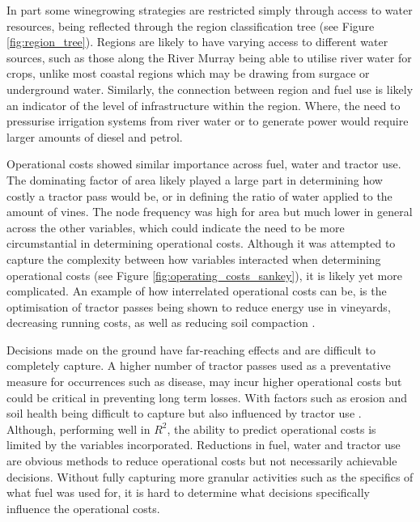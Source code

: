\documentclass[review,12pt,authoryear]{elsarticle}
\begin{document}
\begin{linenumbers}
\par
In part some winegrowing strategies are restricted simply through access to water resources, being reflected through the region classification tree (see Figure \ref{fig:region_tree}). Regions are likely to have varying access to different water sources, such as those along the River Murray being able to utilise river water for crops, unlike most coastal regions which may be drawing from surgace or underground water. Similarly, the connection between region and fuel use is likely an indicator of the level of infrastructure within the region. Where, the need to pressurise irrigation systems from river water or to generate power would require larger amounts of diesel and petrol. %
\par
Operational costs showed similar importance across fuel, water and tractor use. The dominating factor of area likely played a large part in determining how costly a tractor pass would be, or in defining the ratio of water applied to the amount of vines. The node frequency was high for area but much lower in general across the other variables, which could indicate the need to be more circumstantial in determining operational costs. Although it was attempted to capture the complexity between how variables interacted when determining operational costs (see Figure \ref{fig:operating_costs_sankey}), it is likely yet more complicated. An example of how interrelated operational costs can be, is 
the optimisation of tractor passes %
being shown to reduce energy use in vineyards, decreasing running costs, as well as reducing soil compaction \citep{capelloEffectsTractorPasses2019}. 
\par
Decisions made on the ground have far-reaching effects and are difficult to completely capture. A higher number of tractor passes used as a preventative measure for occurrences such as disease, may incur higher operational costs but could be critical in preventing long term losses. With factors such as erosion and soil health being difficult to capture but also influenced by tractor use \citep{capelloEffectsTractorPasses2019,capelloPermanentCoverSoil2020}. Although, performing well in $R^2$, the ability to predict operational costs is limited by the variables incorporated. Reductions in fuel, water and tractor use are obvious methods to reduce operational costs but not necessarily achievable decisions. Without fully capturing more granular activities such as the specifics of what fuel was used for, it is hard to determine what decisions specifically influence the operational costs.

\end{linenumbers}
\end{document}
